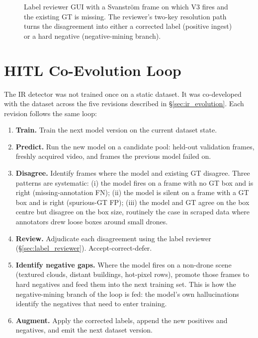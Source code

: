\documentclass[12pt,a4paper,oneside,openright]{book}
\begin{document}
\begin{figure}[htbp]
    \centering
    \caption{Label reviewer GUI with a Svanstr\"om frame on which V3 fires and the existing GT is missing. The reviewer's two-key resolution path turns the disagreement into either a corrected label (positive ingest) or a hard negative (negative-mining branch).}
    \label{fig:label_reviewer}
\end{figure}

\section{HITL Co-Evolution Loop}
\label{sec:hitl_ir}

The IR detector was not trained once on a static dataset. It was co-developed with the dataset across the five revisions described in \S\ref{sec:ir_evolution}. Each revision follows the same loop:

\begin{enumerate}
    \item \textbf{Train.} Train the next model version on the current dataset state.
    \item \textbf{Predict.} Run the new model on a candidate pool: held-out validation frames, freshly acquired video, and frames the previous model failed on.
    \item \textbf{Disagree.} Identify frames where the model and existing GT disagree. Three patterns are systematic: (i) the model fires on a frame with no GT box and is right (missing-annotation FN); (ii) the model is silent on a frame with a GT box and is right (spurious-GT FP); (iii) the model and GT agree on the box centre but disagree on the box size, routinely the case in scraped data where annotators drew loose boxes around small drones.
    \item \textbf{Review.} Adjudicate each disagreement using the label reviewer (\S\ref{sec:label_reviewer}). Accept-correct-defer.
    \item \textbf{Identify negative gaps.} Where the model fires on a non-drone scene (textured clouds, distant buildings, hot-pixel rows), promote those frames to hard negatives and feed them into the next training set. This is how the negative-mining branch of the loop is fed: the model's own hallucinations identify the negatives that need to enter training.
    \item \textbf{Augment.} Apply the corrected labels, append the new positives and negatives, and emit the next dataset version.
\end{enumerate}
\end{document}
